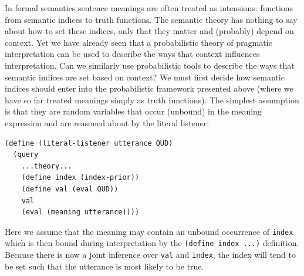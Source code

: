 \documentclass[pdfextras]{handbook}
\begin{document}
In formal semantics \citep{lewis70,montague1973} sentence meanings are often treated as intensions: functions from semantic indices to truth functions.  The semantic theory has nothing to say about how to set these indices, only that they matter and (probably) depend on context. Yet we have already seen that a probabilistic theory of pragmatic interpretation can be used to describe the ways that context influences interpretation. Can we similarly use probabilistic tools to describe the ways that semantic indices are set based on context?
We must first decide how semantic indices should enter into the probabilistic framework presented above (where we have so far treated meanings simply as truth functions). The simplest assumption is that they are random variables that occur (unbound) in the meaning expression and are reasoned about by the literal listener:
\begin{lstlisting}
(define (literal-listener utterance QUD)
  (query
    ...theory...
    (define index (index-prior))
    (define val (eval QUD))
    val
    (eval (meaning utterance))))
\end{lstlisting}
Here we assume that the meaning may contain an unbound occurrence of \lstinline{index} which is then bound during interpretation by  the \lstinline{(define index ...)} definition.
Because there is now a joint inference over \lstinline{val} and \lstinline{index}, the index will tend to be set such that the utterance is most likely to be true. 
\end{document}
